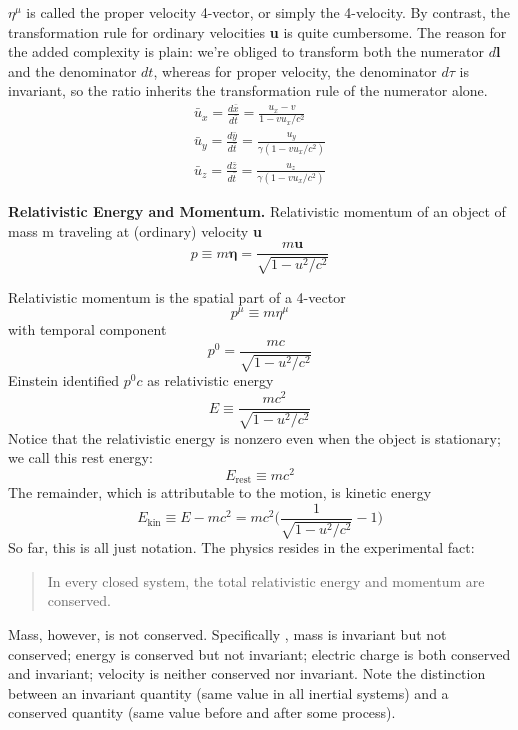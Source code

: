 \documentclass[../main.tex]{subfiles}
\begin{document}
$\eta^\mu$ is called the proper velocity 4-vector, or simply the 4-velocity. By contrast, the transformation rule for ordinary velocities \textbf{u} is quite cumbersome. The reason for the added complexity is plain: we're obliged to transform both the numerator $d\mathbf{l}$ and the denominator $dt$, whereas for proper velocity, the denominator $d\tau$ is invariant, so the ratio inherits the transformation rule of the numerator alone.
\begin{align*}
    \bar{u}_x=\frac{d\bar{x}}{d\bar{t}}=\frac{u_x-v}{1-vu_x/c^2}\\
    \bar{u}_y=\frac{d\bar{y}}{d\bar{t}}=\frac{u_y}{\gamma(1-vu_x/c^2)}\\
    \bar{u}_z=\frac{d\bar{z}}{d\bar{t}}=\frac{u_z}{\gamma(1-vu_x/c^2)}
\end{align*}

\textbf{Relativistic Energy and Momentum.} Relativistic momentum of an object of mass m traveling at (ordinary) velocity \textbf{u} 
\begin{equation*}
    p\equiv m\mathbf{\eta}=\frac{m\mathbf{u}}{\sqrt{1-u^2/c^2}}
\end{equation*}

Relativistic momentum is the spatial part of a 4-vector
\begin{equation*}
    p^\mu\equiv m\eta^\mu
\end{equation*}
with temporal component
\begin{equation*}
    p^0=\frac{mc}{\sqrt{1-u^2/c^2}}
\end{equation*}
Einstein identified $p^0c$ as relativistic energy
\begin{equation*}
    E\equiv\frac{mc^2}{\sqrt{1-u^2/c^2}}
\end{equation*}
Notice that the relativistic energy is nonzero even when the object is stationary; we call this rest energy:
\begin{equation*}
E_{\text{rest}}\equiv mc^2
\end{equation*}
The remainder, which is attributable to the motion, is kinetic energy
\begin{equation*}
E_{\text{kin}}\equiv E-mc^2=mc^2\bigg(\frac{1}{\sqrt{1-u^2/c^2}}-1\bigg)
\end{equation*}
So far, this is all just notation. The physics resides in the experimental fact:
\begin{quote}
    In every closed system, the total relativistic energy and momentum are conserved.
\end{quote}
Mass, however, is not conserved. Specifically , mass is invariant but not conserved; energy is conserved but not invariant; electric charge is both conserved and invariant; velocity is neither conserved nor invariant. Note the distinction between an invariant quantity (same value in all inertial systems) and a conserved quantity (same value before and after some process).
\end{document}
